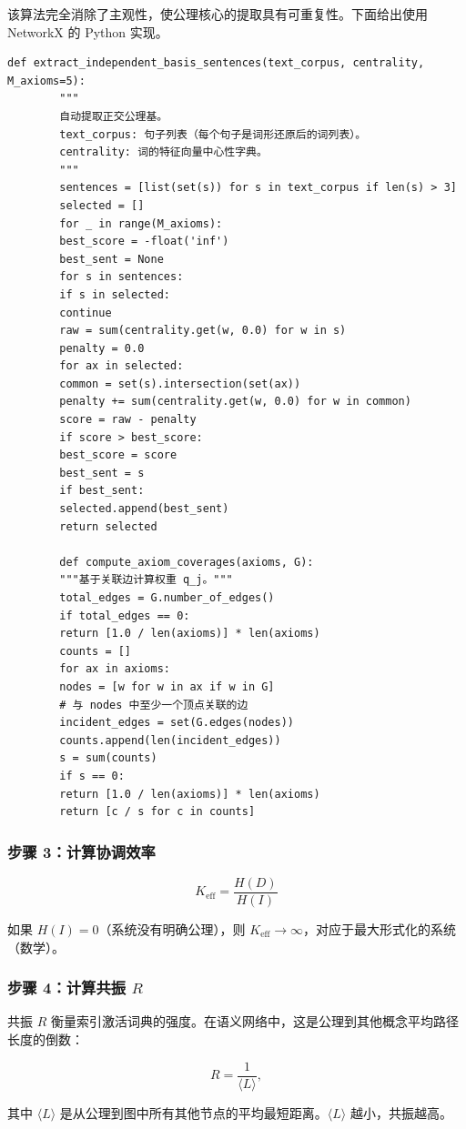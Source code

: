 \documentclass[11pt,a4paper]{article}
\begin{document}
	该算法完全消除了主观性，使公理核心的提取具有可重复性。下面给出使用 NetworkX 的 Python 实现。
	
	\begin{lstlisting}[caption={提取独立公理基的函数}, label={lst:basis}]
		def extract_independent_basis_sentences(text_corpus, centrality, M_axioms=5):
		"""
		自动提取正交公理基。
		text_corpus: 句子列表（每个句子是词形还原后的词列表）。
		centrality: 词的特征向量中心性字典。
		"""
		sentences = [list(set(s)) for s in text_corpus if len(s) > 3]
		selected = []
		for _ in range(M_axioms):
		best_score = -float('inf')
		best_sent = None
		for s in sentences:
		if s in selected:
		continue
		raw = sum(centrality.get(w, 0.0) for w in s)
		penalty = 0.0
		for ax in selected:
		common = set(s).intersection(set(ax))
		penalty += sum(centrality.get(w, 0.0) for w in common)
		score = raw - penalty
		if score > best_score:
		best_score = score
		best_sent = s
		if best_sent:
		selected.append(best_sent)
		return selected
		
		def compute_axiom_coverages(axioms, G):
		"""基于关联边计算权重 q_j。"""
		total_edges = G.number_of_edges()
		if total_edges == 0:
		return [1.0 / len(axioms)] * len(axioms)
		counts = []
		for ax in axioms:
		nodes = [w for w in ax if w in G]
		# 与 nodes 中至少一个顶点关联的边
		incident_edges = set(G.edges(nodes))
		counts.append(len(incident_edges))
		s = sum(counts)
		if s == 0:
		return [1.0 / len(axioms)] * len(axioms)
		return [c / s for c in counts]
	\end{lstlisting}
	
	\subsubsection{步骤 3：计算协调效率}
	
	\[
	\boxed{
		K_{\mathrm{eff}} = \frac{H(D)}{H(I)}
	}
	\]
	
	如果 \(H(I) = 0\)（系统没有明确公理），则 \(K_{\mathrm{eff}} \to \infty\)，对应于最大形式化的系统（数学）。
	
	\subsubsection{步骤 4：计算共振 \(R\)}
	
	共振 \(R\) 衡量索引激活词典的强度。在语义网络中，这是公理到其他概念平均路径长度的倒数：
	
	\[
	R = \frac{1}{\langle L \rangle},
	\]
	
	其中 \(\langle L \rangle\) 是从公理到图中所有其他节点的平均最短距离。\(\langle L \rangle\) 越小，共振越高。
	
\end{document}
